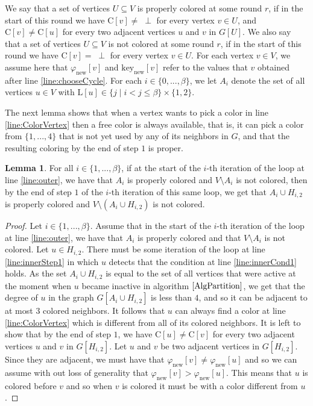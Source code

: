 \documentclass{article}
\theoremstyle{definition}
\newtheorem{lemma}{Lemma}[section]
\begin{document}
We say that a set of vertices $U \subseteq V$ is properly colored at some round $r$, if in the start of this round we have $\text{C}[v] \ne \; \perp$ for every vertex $v \in U$, and $\text{C}[v] \ne \text{C}[u]$ for every two adjacent vertices $u$ and $v$ in $G[U]$. We also say that a set of vertices $U \subseteq V$ is not colored at some round $r$, if in the start of this round we have $\text{C}[v] = \; \perp$ for every vertex $v \in U$. For each vertex $v \in V$, we assume here that $\varphi_{\text{new}}[v]$ and $\text{key}_{\text{new}}[v]$ refer to the values that $v$ obtained after line \ref{line:chooseCycle}. For each $i \in \{0, ..., \beta\}$, we let $A_i$ denote the set of all vertices $u \in V$ with $\text{L}[u] \in \{j \mid i < j \le \beta\} \times \{1,2\}$.


The next lemma shows that when a vertex wants to pick a color in line \ref{line:ColorVertex} then a free color is always available, that is, it can pick a color from $\{1,...,4 \}$ that is not yet used by any of its neighbors in $G$, and that the resulting coloring by the end of step $1$ is proper.

\begin{lemma}  For all $i \in \{1, ..., \beta\}$, if at the start of the $i$-th iteration of the loop at line \ref{line:outer}, we have that $A_i$ is properly colored and $V \setminus A_i$ is not colored, then by the end of step $1$ of the $i$-th iteration of this same loop, we get that $A_i \cup H_{i,2}$ is properly colored and $V \setminus (A_i \cup H_{i,2})$ is not colored.\end{lemma}

\begin{proof} Let $i \in \{1, ..., \beta\}$. Assume that in the start of the $i$-th iteration of the loop at line \ref{line:outer}, we have that $A_i$ is properly colored and that $V \setminus A_i$ is not colored. Let $u \in H_{i,2}$. There must be some iteration of the loop at line \ref{line:innerStep1} in which $u$ detects that the condition at line \ref{line:innerCond1} holds. As the set $A_i \cup H_{i,2}$ is equal to the set of all vertices that were active at the moment when $u$ became inactive in algorithm $\ref{AlgPartition}$, we get that the degree of $u$ in the graph $G[A_i \cup H_{i,2}]$ is less than $4$, and so it can be adjacent to at most $3$ colored neighbors. It follows that $u$ can always find a color at line \ref{line:ColorVertex} which is different from all of its colored neighbors. It is left to show that by the end of step $1$, we have $\text{C}[u] \ne \text{C}[v]$ for every two adjacent vertices $u$ and $v$ in $G[H_{i,2}]$. Let $u$ and $v$ be two adjacent vertices in $G[H_{i,2}]$. Since they are adjacent, we must have that $\varphi_{\text{new}}[v] \ne \varphi_{\text{new}}[u]$ and so we can assume with out loss of generality that $\varphi_{\text{new}}[v] > \varphi_{\text{new}}[u]$. This means that $u$ is colored before $v$ and so when $v$ is colored it must be with a color different from $u$. \end{proof}
\end{document}
